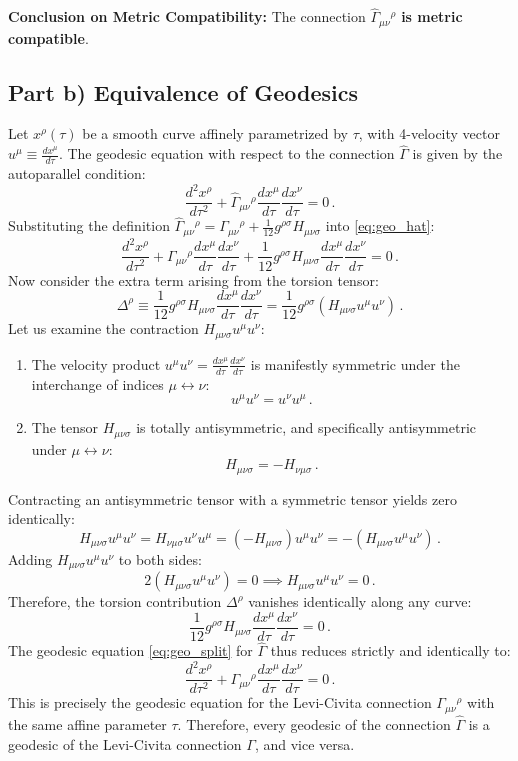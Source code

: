 \documentclass[12pt]{article}
\newcommand{\be}{\begin{equation}}
\newcommand{\ee}{\end{equation}}
\begin{document}
\textbf{Conclusion on Metric Compatibility:} The connection $\hat\Gamma_{\mu\nu}{}^\rho$ \textbf{is metric compatible}. 

\subsection*{Part b) Equivalence of Geodesics}

Let $x^\rho(\tau)$ be a smooth curve affinely parametrized by $\tau$, with 4-velocity vector $u^\mu \equiv \frac{dx^\mu}{d\tau}$.
The geodesic equation with respect to the connection $\hat\Gamma$ is given by the autoparallel condition:
\be
\frac{d^2 x^\rho}{d\tau^2} + \hat\Gamma_{\mu\nu}{}^\rho \frac{dx^\mu}{d\tau} \frac{dx^\nu}{d\tau} = 0 \,.
\label{eq:geo_hat}
\ee
Substituting the definition $\hat\Gamma_{\mu\nu}{}^\rho = \Gamma_{\mu\nu}{}^\rho + \frac{1}{12} g^{\rho\sigma} H_{\mu\nu\sigma}$ into \eqref{eq:geo_hat}:
\be
\frac{d^2 x^\rho}{d\tau^2} + \Gamma_{\mu\nu}{}^\rho \frac{dx^\mu}{d\tau} \frac{dx^\nu}{d\tau} + \frac{1}{12} g^{\rho\sigma} H_{\mu\nu\sigma} \frac{dx^\mu}{d\tau} \frac{dx^\nu}{d\tau} = 0 \,.
\label{eq:geo_split}
\ee
Now consider the extra term arising from the torsion tensor:
\be
\Delta^\rho \equiv \frac{1}{12} g^{\rho\sigma} H_{\mu\nu\sigma} \frac{dx^\mu}{d\tau} \frac{dx^\nu}{d\tau} = \frac{1}{12} g^{\rho\sigma} \left( H_{\mu\nu\sigma} u^\mu u^\nu \right) \,.
\ee
Let us examine the contraction $H_{\mu\nu\sigma} u^\mu u^\nu$:
\begin{enumerate}
    \item The velocity product $u^\mu u^\nu = \frac{dx^\mu}{d\tau} \frac{dx^\nu}{d\tau}$ is manifestly symmetric under the interchange of indices $\mu \leftrightarrow \nu$:
    \be
    u^\mu u^\nu = u^\nu u^\mu \,.
    \ee
    \item The tensor $H_{\mu\nu\sigma}$ is totally antisymmetric, and specifically antisymmetric under $\mu \leftrightarrow \nu$:
    \be
    H_{\mu\nu\sigma} = - H_{\nu\mu\sigma} \,.
    \ee
\end{enumerate}
Contracting an antisymmetric tensor with a symmetric tensor yields zero identically:
\be
H_{\mu\nu\sigma} u^\mu u^\nu = H_{\nu\mu\sigma} u^\nu u^\mu = (- H_{\mu\nu\sigma}) u^\mu u^\nu = - (H_{\mu\nu\sigma} u^\mu u^\nu) \,.
\ee
Adding $H_{\mu\nu\sigma} u^\mu u^\nu$ to both sides:
\be
2 \left( H_{\mu\nu\sigma} u^\mu u^\nu \right) = 0 \implies H_{\mu\nu\sigma} u^\mu u^\nu = 0 \,.
\ee
Therefore, the torsion contribution $\Delta^\rho$ vanishes identically along any curve:
\be
\frac{1}{12} g^{\rho\sigma} H_{\mu\nu\sigma} \frac{dx^\mu}{d\tau} \frac{dx^\nu}{d\tau} = 0 \,.
\ee
The geodesic equation \eqref{eq:geo_split} for $\hat\Gamma$ thus reduces strictly and identically to:
\be
\frac{d^2 x^\rho}{d\tau^2} + \Gamma_{\mu\nu}{}^\rho \frac{dx^\mu}{d\tau} \frac{dx^\nu}{d\tau} = 0 \,.
\ee
This is precisely the geodesic equation for the Levi-Civita connection $\Gamma_{\mu\nu}{}^\rho$ with the same affine parameter $\tau$.
Therefore, every geodesic of the connection $\hat\Gamma$ is a geodesic of the Levi-Civita connection $\Gamma$, and vice versa.
\end{document}
